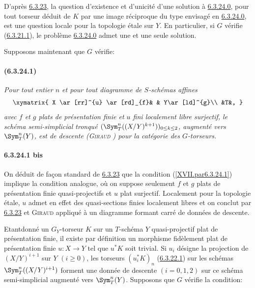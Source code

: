 \documentclass[10pt]{../fichiers-configuration-latex/smfart}
\begin{document}
D'après \hyperref[XVII.prop6.3.23]{6.3.23}, la question d'existence et d'unicité d'une solution à
\hyperref[XVII.par6.3.24.0]{6.3.24.0}, pour tout torseur déduit de $K$ par une image réciproque du
type envisagé en \hyperref[XVII.par6.3.24.0]{6.3.24.0}, est une question locale pour la topologie
étale sur $Y$. En particulier, si $G$ vérifie (\hyperref[XVII.par6.3.21.1]{6.3.21.1}), le problème
\hyperref[XVII.par6.3.24.0]{6.3.24.0} admet une et une seule solution.

Supposons maintenant que $G$ vérifie:

\paragraph*{(6.3.24.1)}\label{XVII.par6.3.24.1}
\emph{Pour tout entier $n$ et pour tout diagramme de $S$-schémas
affines
\[
\xymatrix{
X \ar[rr]^{u} \ar[rd]_{f}& & Y\ar[ld]^{g}\\
  &T&,
}
\]
avec $f$ et $g$ plats de présentation finie et $u$ fini
localement libre surjectif, le schéma semi-simplicial tronqué
$(\Sym^{n}_{T}((X/Y)^{k+1}))_{0\leq k\leq 2}$, augmenté vers
$\Sym^{n}_{T}(Y)$, est de descente \emph{(\textsc{Giraud} \cite{SGA4-17:Gi})} pour la
catégorie des $G$-torseurs.}

\paragraph*{6.3.24.1 bis}
On déduit de façon standard de \hyperref[XVII.prop6.3.23]{6.3.23} que la
condition  (\ref{XVII.par6.3.24.1})
implique la condition analogue, où on suppose seulement $f$ et $g$
plats de présentation finie quasi-projectifs et $u$ plat
surjectif. Localement pour la topologie étale, $u$ admet en effet des
quasi-sections finies localement libres et on conclut par \hyperref[XVII.prop6.3.23]{6.3.23} et
\textsc{Giraud} \cite{SGA4-17:Gi} appliqué à un diagramme formant carré de données de descente.

Etant\pageoriginale donné un $G_{Y}$-torseur $K$ sur un $T$-schéma $Y$
quasi-projectif plat de présentation finie, il existe par définition
un morphisme fidèlement plat de présentation finie $u:X\rightarrow Y$
tel que $u^{\ast}K$ soit trivial. Si $u_{i}$ désigne la projection de
$(X/Y)^{i+1}$ sur $Y$ $(i\geq 0)$, les torseurs $(u^{\ast}_{i}K)_{n}$
(\hyperref[XVII.lem6.3.22.1]{6.3.22.1}) sur les schémas $\Sym^{n}_{T}((X/Y)^{i+1})$ forment une
donnée de descente $(i=0,1,2)$ sur ce schéma semi-simplicial augmenté
vers $\Sym^{n}_{T}(Y)$. Supposons que $G$ vérifie la condition:
\end{document}
